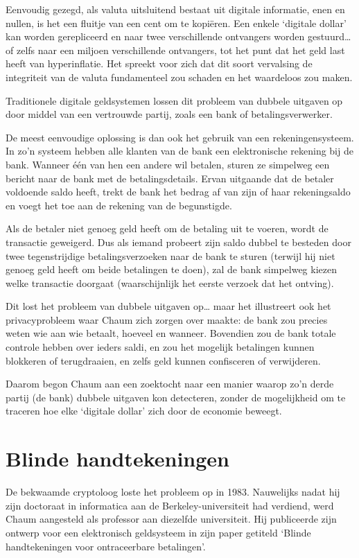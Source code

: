 \documentclass[
  a5paper,
  smalldemyvopaper,11pt,twoside,onecolumn,openright,extrafontsizes]{memoir}
\begin{document}
Eenvoudig gezegd, als valuta uitsluitend bestaat uit digitale
informatie, enen en nullen, is het een fluitje van een cent om te
kopiëren. Een enkele `digitale dollar' kan worden gerepliceerd en naar
twee verschillende ontvangers worden gestuurd\ldots{} of zelfs naar een
miljoen verschillende ontvangers, tot het punt dat het geld last heeft
van hyperinflatie. Het spreekt voor zich dat dit soort vervalsing de
integriteit van de valuta fundamenteel zou schaden en het waardeloos zou
maken.

Traditionele digitale geldsystemen lossen dit probleem van dubbele
uitgaven op door middel van een vertrouwde partij, zoals een bank of
betalingsverwerker.

De meest eenvoudige oplossing is dan ook het gebruik van een
rekeningensysteem. In zo'n systeem hebben alle klanten van de bank een
elektronische rekening bij de bank. Wanneer één van hen een andere wil
betalen, sturen ze simpelweg een bericht naar de bank met de
betalingsdetails. Ervan uitgaande dat de betaler voldoende saldo heeft,
trekt de bank het bedrag af van zijn of haar rekeningsaldo en voegt het
toe aan de rekening van de begunstigde.

Als de betaler niet genoeg geld heeft om de betaling uit te voeren,
wordt de transactie geweigerd. Dus als iemand probeert zijn saldo dubbel
te besteden door twee tegenstrijdige betalingsverzoeken naar de bank te
sturen (terwijl hij niet genoeg geld heeft om beide betalingen te doen),
zal de bank simpelweg kiezen welke transactie doorgaat (waarschijnlijk
het eerste verzoek dat het ontving).

Dit lost het probleem van dubbele uitgaven op\ldots{} maar het
illustreert ook het privacyprobleem waar Chaum zich zorgen over maakte:
de bank zou precies weten wie aan wie betaalt, hoeveel en wanneer.
Bovendien zou de bank totale controle hebben over ieders saldi, en zou
het mogelijk betalingen kunnen blokkeren of terugdraaien, en zelfs geld
kunnen confisceren of verwijderen.

Daarom begon Chaum aan een zoektocht naar een manier waarop zo'n derde
partij (de bank) dubbele uitgaven kon detecteren, zonder de mogelijkheid
om te traceren hoe elke `digitale dollar' zich door de economie beweegt.

\section{Blinde handtekeningen}\label{blinde-handtekeningen}

De bekwaamde cryptoloog loste het probleem op in 1983. Nauwelijks nadat
hij zijn doctoraat in informatica aan de Berkeley-universiteit had
verdiend, werd Chaum aangesteld als professor aan diezelfde
universiteit. Hij publiceerde zijn ontwerp voor een elektronisch
geldsysteem in zijn paper getiteld `Blinde handtekeningen voor
ontraceerbare betalingen'.
\end{document}
